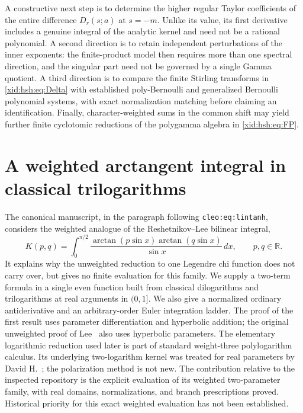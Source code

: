 \documentclass[11pt,a4paper]{article}
\numberwithin{equation}{section}
\theoremstyle{definition}
\theoremstyle{remark}
\begin{document}
A constructive next step is to determine the higher regular Taylor
coefficients of the entire difference $D_r(s;a)$ at $s=-m$. Unlike its
value, its first derivative includes a genuine integral of the analytic
kernel and need not be a rational polynomial. A second direction is to
retain independent perturbations of the inner exponents: the finite-product
model then requires more than one spectral direction, and the singular
part need not be governed by a single Gamma quotient. A third direction is to compare the finite
Stirling transforms in \eqref{xid:hsh:eq:Delta} with established
poly-Bernoulli and generalized Bernoulli polynomial systems, with exact
normalization matching before claiming an identification. Finally,
character-weighted sums in the common shift may yield further finite
cyclotomic reductions of the polygamma algebra in \eqref{xid:hsh:eq:FP}.



\section{A weighted arctangent integral in classical trilogarithms}
\label{xid:wat:sec}

The canonical manuscript, in the paragraph following
\texttt{cleo:eq:lintanh}, considers the weighted analogue of the
Reshetnikov--Lee bilinear integral,
\begin{equation}\label{xid:wat:eq:K}
 K(p,q)=\int_0^{\pi/2}
 \frac{\arctan(p\sin x)\arctan(q\sin x)}{\sin x}\,dx,
 \qquad p,q\in\mathbb R.
\end{equation}
It explains why the unweighted reduction to one Legendre chi function
does not carry over, but gives no finite evaluation for this family.
We supply a two-term formula in a single even function built from
classical dilogarithms and trilogarithms at real arguments in $(0,1]$.
We also give a normalized ordinary antiderivative and an
arbitrary-order Euler integration ladder. The proof of the first
result uses parameter differentiation and hyperbolic addition;
the original unweighted proof of Lee~\cite{wat:Lee} also uses
hyperbolic parameters. The elementary logarithmic reduction used
later is part of standard weight-three polylogarithm calculus.
Its underlying two-logarithm kernel was treated for real parameters
by David H.~\cite{wat:DavidH}; the polarization method is not new.
The contribution relative to the inspected repository is the explicit
evaluation of its weighted two-parameter family, with real domains,
normalizations, and branch prescriptions proved. Historical priority
for this exact weighted evaluation has not been established.
\end{document}
